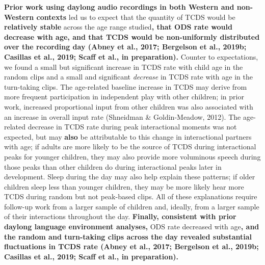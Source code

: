 \documentclass[,man,floatsintext]{apa6}
\begin{document}
\textbf{Prior work using daylong audio recordings in both Western and
non-Western contexts} led us to expect that the quantity of TCDS would
be \textbf{relatively stable} across the age range studied\textbf{, that
ODS rate would decrease with age, and that TCDS would be non-uniformly
distributed over the recording day (Abney et al., 2017; Bergelson et
al., 2019b; Casillas et al., 2019; Scaff et al., in preparation).
}Counter to expectations, we found a small but significant increase in
TCDS rate with child age in the random clips and a small and significant
\emph{decrease} in TCDS rate with age in the turn-taking clips. The
age-related baseline increase in TCDS may derive from more frequent
participation in independent play with other children; in prior work,
increased proportional input from other children was also associated
with an increase in overall input rate (Shneidman \& Goldin-Meadow,
2012). The age-related decrease in TCDS rate during peak interactional
moments was not expected, but may \textbf{also} be attributable to this
change in interactional partners with age; if adults are more likely to
be the source of TCDS during interactional peaks for younger children,
they may also provide more voluminous speech during those peaks than
other children do during interactional peaks later in development. Sleep
during the day may also help explain these patterns; if older children
sleep less than younger children, they may be more likely hear more TCDS
during random but not peak-based clips. All of these explanations
require follow-up work from a larger sample of children and, ideally,
from a larger sample of their interactions throughout the day.
\textbf{Finally, consistent with prior daylong language environment
analyses,} ODS rate decreased with age\textbf{, and the random and
turn-taking clips across the day revealed substantial fluctuations in
TCDS rate (Abney et al., 2017; Bergelson et al., 2019b; Casillas et al.,
2019; Scaff et al., in preparation).}
\end{document}
